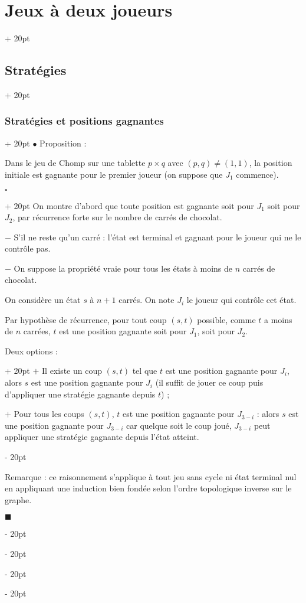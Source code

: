 \documentclass[a4paper, 12pt, twoside]{article}
\newcommand{\ind}[1][20pt]{\advance\leftskip + #1}
\newcommand{\deind}[1][20pt]{\advance\leftskip - #1}
\newenvironment{indt}[2][20pt]{#2 \par \ind[#1]}{\par \deind} %
\newenvironment{proof}[1][{}]{\begin{indt}{$\square$ #1}}{$\blacksquare$ \end{indt}}
\begin{document}
\begin{indt}{\section{Jeux à deux joueurs}}
\begin{indt}{\subsection{Stratégies}}
\begin{indt}{\subsubsection{Stratégies et positions gagnantes}}
                $\bullet$ Proposition :
                \begin{emphBox}
                    Dans le jeu de Chomp sur une tablette $p \times q$ avec $(p, q) \neq (1, 1)$, la position initiale est gagnante pour le premier joueur (on suppose que $J_1$ commence).
                \end{emphBox}

                \vspace{6pt}
                
                \begin{proof}
                    On montre d'abord que toute position est gagnante soit pour $J_1$ soit pour $J_2$, par récurrence forte sur le nombre de carrés de chocolat.

                    $-$ S'il ne reste qu'un carré : l'état est terminal et gagnant pour le joueur qui ne le contrôle pas.

                    $-$ On suppose la propriété vraie pour tous les états à moins de $n$ carrés de chocolat.

                    On considère un état $s$ à $n + 1$ carrés. On note $J_i$ le joueur qui contrôle cet état.

                    Par hypothèse de récurrence, pour tout coup $(s, t)$ possible, comme $t$ a moins de $n$ carrées, $t$ est une position gagnante soit pour $J_1$, soit pour $J_2$.

                    \begin{indt}{Deux options :}
                        $+$ Il existe un coup $(s, t)$ tel que $t$ est une position gagnante pour $J_i$, alors $s$ est une position gagnante pour $J_i$ (il suffit de jouer ce coup puis d'appliquer une stratégie gagnante depuis $t$) ;

                        $+$ Pour tous les coups $(s, t)$, $t$ est une position gagnante pour $J_{3 - i}$ : alors $s$ est une position gagnante pour $J_{3 - i}$ car quelque soit le coup joué, $J_{3 - i}$ peut appliquer une stratégie gagnante depuis l'état atteint.
                    \end{indt}

                    \vspace{6pt}
                    
                    Remarque : ce raisonnement s'applique à tout jeu sans cycle ni état terminal nul en appliquant une induction bien fondée selon l'ordre topologique inverse sur le graphe.


\end{proof}
\end{indt}
\end{indt}
\end{indt}
\end{document}
